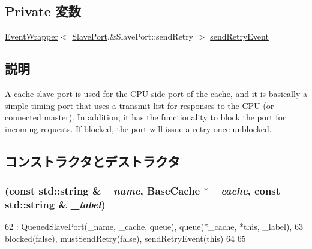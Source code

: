 \subsection*{Private 変数}
\begin{DoxyCompactItemize}
\item 
\hyperlink{classEventWrapper}{EventWrapper}$<$ \hyperlink{classSlavePort}{SlavePort},\&SlavePort::sendRetry $>$ \hyperlink{classBaseCache_1_1CacheSlavePort_a797d0b8335772c15e0e45e2db624eb6c}{sendRetryEvent}
\end{DoxyCompactItemize}


\subsection{説明}
A cache slave port is used for the CPU-\/side port of the cache, and it is basically a simple timing port that uses a transmit list for responses to the CPU (or connected master). In addition, it has the functionality to block the port for incoming requests. If blocked, the port will issue a retry once unblocked. 

\subsection{コンストラクタとデストラクタ}
\hypertarget{classBaseCache_1_1CacheSlavePort_abfe2d39a27aaadaf48dec012af6e65e8}{
\subsubsection[{CacheSlavePort}]{ (const std::string \& {\em \_\-name}, \/  {\bf BaseCache} $\ast$ {\em \_\-cache}, \/  const std::string \& {\em \_\-label})}}
\label{classBaseCache_1_1CacheSlavePort_abfe2d39a27aaadaf48dec012af6e65e8}



\begin{DoxyCode}
62     : QueuedSlavePort(_name, _cache, queue), queue(*_cache, *this, _label),
63       blocked(false), mustSendRetry(false), sendRetryEvent(this)
64 {
65 }
\end{DoxyCode}


